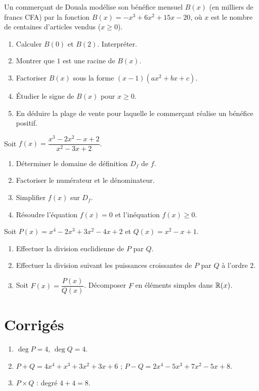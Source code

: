 Un commerçant de Douala modélise son bénéfice mensuel $B(x)$ (en milliers de francs CFA) par la fonction $B(x) = -x^3 + 6x^2 + 15x - 20$, où $x$ est le nombre de centaines d'articles vendus ($x \geq 0$).
\begin{enumerate}[label=\arabic*)]
    \item Calculer $B(0)$ et $B(2)$. Interpréter.
    \item Montrer que $1$ est une racine de $B(x)$.
    \item Factoriser $B(x)$ sous la forme $(x-1)(ax^2 + bx + c)$.
    \item Étudier le signe de $B(x)$ pour $x \geq 0$.
    \item En déduire la plage de vente pour laquelle le commerçant réalise un bénéfice positif.
\end{enumerate}

Soit $f(x) = \dfrac{x^3 - 2x^2 - x + 2}{x^2 - 3x + 2}$.
\begin{enumerate}[label=\arabic*)]
    \item Déterminer le domaine de définition $D_f$ de $f$.
    \item Factoriser le numérateur et le dénominateur.
    \item Simplifier $f(x)$ sur $D_f$.
    \item Résoudre l'équation $f(x) = 0$ et l'inéquation $f(x) \geq 0$.
\end{enumerate}

Soit $P(x) = x^4 - 2x^3 + 3x^2 - 4x + 2$ et $Q(x) = x^2 - x + 1$.
\begin{enumerate}[label=\arabic*)]
    \item Effectuer la division euclidienne de $P$ par $Q$.
    \item Effectuer la division suivant les puissances croissantes de $P$ par $Q$ à l'ordre $2$.
    \item Soit $F(x) = \dfrac{P(x)}{Q(x)}$. Décomposer $F$ en éléments simples dans $\mathbb{R}(x)$.
\end{enumerate}

\section{Corrigés}

\begin{enumerate}[label=\alph*)]
    \item $\deg P = 4$, $\deg Q = 4$.
    \item $P+Q = 4x^4 + x^3 + 3x^2 + 3x + 6$ ; $P-Q = 2x^4 - 5x^3 + 7x^2 - 5x + 8$.
    \item $P \times Q$ : degré $4+4=8$.
\end{enumerate}


